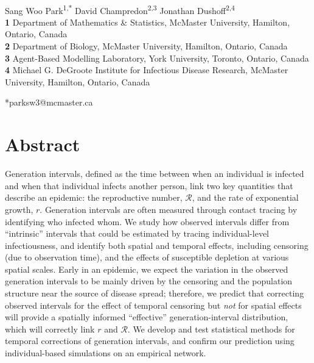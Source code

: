 \documentclass[12pt]{article}
\date{\today}
\newcommand{\RR}{\ensuremath{{\mathcal R}}}
\begin{document}
\begin{flushleft}{
	\Large
	\textbf{}
}
\newline
\\
Sang Woo Park\textsuperscript{1,*}
David Champredon\textsuperscript{2,3}
Jonathan Dushoff\textsuperscript{2,4}
\\

\bigskip
\textbf{1} Department of Mathematics \& Statistics, McMaster University, Hamilton, Ontario, Canada
\\
\textbf{2} Department of Biology, McMaster University, Hamilton, Ontario, Canada
\\
\textbf{3} Agent-Based Modelling Laboratory, York University, Toronto, Ontario, Canada
\\
\textbf{4} Michael G. DeGroote Institute for Infectious Disease Research, McMaster University, Hamilton, Ontario, Canada
\\
\bigskip

*parksw3@mcmaster.ca
\end{flushleft} 

\section*{Abstract}

Generation intervals, defined as the time between when an individual is infected and when that individual infects another person, link two key quantities that describe an epidemic: the reproductive number, $\RR$, and the rate of exponential growth, $r$.
Generation intervals are often measured through contact tracing by identifying who infected whom.
We study how observed intervals differ from ``intrinsic'' intervals that could be estimated by tracing individual-level infectiousness, and identify both spatial and temporal effects, including censoring (due to observation time), and the effects of susceptible depletion at various spatial scales. 
Early in an epidemic, we expect the variation in the observed generation intervals to be mainly driven by the censoring and the population structure near the source of disease spread; 
therefore, we predict that correcting observed intervals for the effect of temporal censoring but \emph{not} for spatial effects will provide a spatially informed ``effective'' generation-interval distribution, which will correctly link $r$ and $\RR$.
We develop and test statistical methods for temporal corrections of generation intervals,
and confirm our prediction using individual-based simulations on an empirical network.
\end{document}
